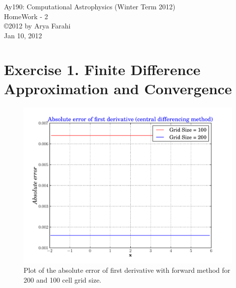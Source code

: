 \documentclass[10pt]{article}
\begin{document}
\begin{center}
{\large Ay190: Computational Astrophysics (Winter Term 2012)} \\
{\large HomeWork - 2 } \\
\copyright 2012 by Arya Farahi \\
Jan 10, 2012
\end{center}

\section{Exercise 1. Finite Difference Approximation and Convergence}

\begin{figure}[hbt]
  \begin{center}
    \includegraphics[scale=0.5]{Plots/plot1.pdf}
    \caption{\label{fig:ForwardMethod} Plot of the absolute error of first derivative with forward method for 200 and 100 cell grid size.}
  \end{center}
\end{figure}
\end{document}
